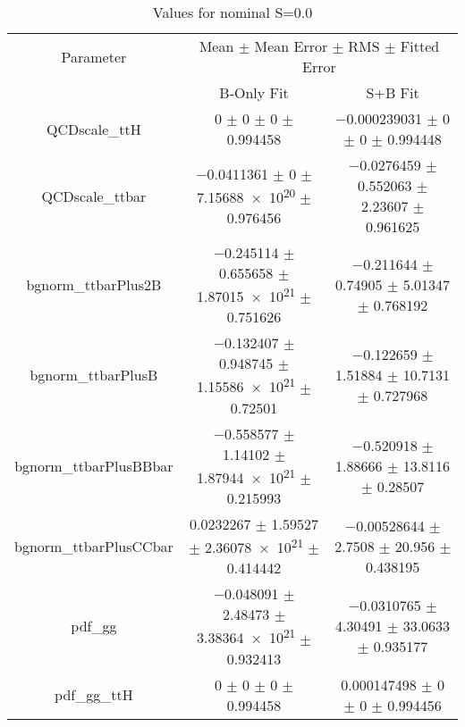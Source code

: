 \begin{table}
\centering
\caption{Values for nominal S=0.0}
\begin{tabular}{ccc}
\toprule
Parameter & \multicolumn{2}{c}{Mean $\pm$ Mean Error $\pm$ RMS $\pm$ Fitted Error}\\
 & B-Only Fit & S+B Fit\\
\midrule
QCDscale\_ttH & \num{0} $\pm$ \num{0} $\pm$ \num{0} $\pm$ \num{0.994458} & \num{-0.000239031} $\pm$ \num{0} $\pm$ \num{0} $\pm$ \num{0.994448}\\
QCDscale\_ttbar & \num{-0.0411361} $\pm$ \num{0} $\pm$ \num{7.15688e+20} $\pm$ \num{0.976456} & \num{-0.0276459} $\pm$ \num{0.552063} $\pm$ \num{2.23607} $\pm$ \num{0.961625}\\
bgnorm\_ttbarPlus2B & \num{-0.245114} $\pm$ \num{0.655658} $\pm$ \num{1.87015e+21} $\pm$ \num{0.751626} & \num{-0.211644} $\pm$ \num{0.74905} $\pm$ \num{5.01347} $\pm$ \num{0.768192}\\
bgnorm\_ttbarPlusB & \num{-0.132407} $\pm$ \num{0.948745} $\pm$ \num{1.15586e+21} $\pm$ \num{0.72501} & \num{-0.122659} $\pm$ \num{1.51884} $\pm$ \num{10.7131} $\pm$ \num{0.727968}\\
bgnorm\_ttbarPlusBBbar & \num{-0.558577} $\pm$ \num{1.14102} $\pm$ \num{1.87944e+21} $\pm$ \num{0.215993} & \num{-0.520918} $\pm$ \num{1.88666} $\pm$ \num{13.8116} $\pm$ \num{0.28507}\\
bgnorm\_ttbarPlusCCbar & \num{0.0232267} $\pm$ \num{1.59527} $\pm$ \num{2.36078e+21} $\pm$ \num{0.414442} & \num{-0.00528644} $\pm$ \num{2.7508} $\pm$ \num{20.956} $\pm$ \num{0.438195}\\
pdf\_gg & \num{-0.048091} $\pm$ \num{2.48473} $\pm$ \num{3.38364e+21} $\pm$ \num{0.932413} & \num{-0.0310765} $\pm$ \num{4.30491} $\pm$ \num{33.0633} $\pm$ \num{0.935177}\\
pdf\_gg\_ttH & \num{0} $\pm$ \num{0} $\pm$ \num{0} $\pm$ \num{0.994458} & \num{0.000147498} $\pm$ \num{0} $\pm$ \num{0} $\pm$ \num{0.994456}\\
\bottomrule
\end{tabular}
\end{table}